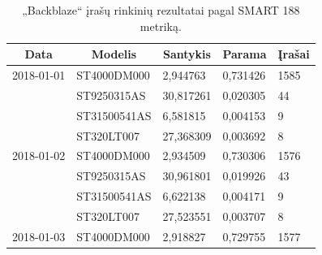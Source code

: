 \documentclass{VUMIFPSkursinis}
\begin{document}
\begin{table}[H]
\centering
\caption{„Backblaze“ įrašų rinkinių rezultatai pagal SMART 188 metriką.}
\label{tab:rez188}
{\begin{tabular}{|l|l|l|l|l|}
\hline
\multicolumn{1}{|c|}{\textbf{Data}} & \multicolumn{1}{c|}{\textbf{Modelis}} & \multicolumn{1}{c|}{\textbf{Santykis}} & \multicolumn{1}{c|}{\textbf{Parama}} & \multicolumn{1}{c|}{\textbf{Įrašai}} \\ \hline
2018-01-01                          & ST4000DM000                           & 2,944763                               & 0,731426                             & 1585                                 \\ \hline
\cellcolor[HTML]{C0C0C0}            & ST9250315AS                           & 30,817261                              & 0,020305                             & 44                                   \\ \hline
\cellcolor[HTML]{C0C0C0}            & ST31500541AS                          & 6,581815                               & 0,004153                             & 9                                    \\ \hline
\cellcolor[HTML]{C0C0C0}            & ST320LT007                            & 27,368309                              & 0,003692                             & 8                                    \\ \hline
2018-01-02                          & ST4000DM000                           & 2,934509                               & 0,730306                             & 1576                                 \\ \hline
\cellcolor[HTML]{C0C0C0}            & ST9250315AS                           & 30,961801                              & 0,019926                             & 43                                   \\ \hline
\cellcolor[HTML]{C0C0C0}            & ST31500541AS                          & 6,622138                               & 0,004171                             & 9                                    \\ \hline
\cellcolor[HTML]{C0C0C0}            & ST320LT007                            & 27,523551                              & 0,003707                             & 8                                    \\ \hline
2018-01-03                          & ST4000DM000                           & 2,918827                               & 0,729755                             & 1577                                 \\ \hline

\end{tabular}}
\end{table}
\end{document}
